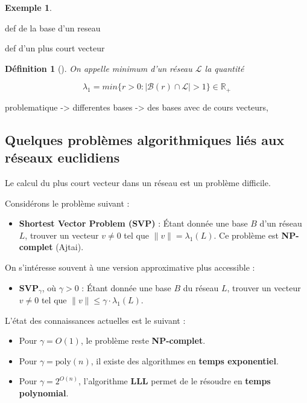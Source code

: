 \documentclass[a4paper,12pt]{report}  %
\theoremstyle{definitionstyle}
\newtheorem{definition}{Définition}[chapter] %
\theoremstyle{examplestyle}
\newtheorem{example}{Exemple}[chapter] %
\theoremstyle{remarkstyle}
\theoremstyle{propositionstyle}
\theoremstyle{theoremstyle}
\begin{document}
	
	
	\begin{example}
		
	\end{example}
	def de la base d'un reseau
	
	def d'un plus court vecteur
	
	\begin{definition}[\cite{Wallet}]
		On appelle minimum d'un réseau $\mathcal{L}$ la quantité
		
		$$\lambda_1 = min\{r>0 : |\mathcal{B}(r)\cap\mathcal{L}|>1\} \in \mathbb{R_+}$$
	\end{definition}
	
	
	problematique -> differentes bases -> des bases avec de cours vecteurs,
	
	\subsection{Quelques problèmes algorithmiques liés aux réseaux euclidiens}
	
	Le calcul du plus court vecteur dans un réseau est un problème difficile.
	
	Considérons le problème suivant :
	
	\begin{itemize}
		\item \textbf{Shortest Vector Problem (SVP)} : Étant donnée une base $B$ d’un réseau $L$, trouver un vecteur $v \neq 0$ tel que $\|v\| = \lambda_1(L)$. Ce problème est \textbf{NP-complet} (Ajtai).
	\end{itemize}
	
	On s’intéresse souvent à une version approximative plus accessible :
	
	\begin{itemize}
		\item \textbf{SVP$_\gamma$}, où $\gamma > 0$ : Étant donnée une base $B$ du réseau $L$, trouver un vecteur $v \neq 0$ tel que $\|v\| \leq \gamma \cdot \lambda_1(L)$.
	\end{itemize}
	
	L’état des connaissances actuelles est le suivant :
	
	\begin{itemize}
		\item Pour $\gamma = O(1)$, le problème reste \textbf{NP-complet}.
		\item Pour $\gamma = \text{poly}(n)$, il existe des algorithmes en \textbf{temps exponentiel}.
		\item Pour $\gamma = 2^{O(n)}$, l’algorithme \textbf{LLL} permet de le résoudre en \textbf{temps polynomial}.
	\end{itemize}
	
\end{document}
